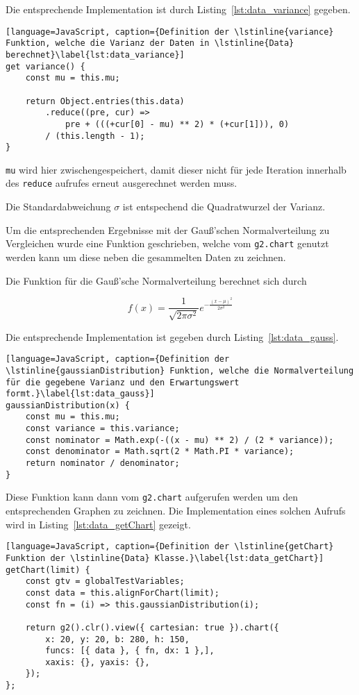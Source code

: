 Die entsprechende Implementation ist durch Listing~\ref{lst:data_variance} gegeben.

\begin{lstlisting}[language=JavaScript, caption={Definition der \lstinline{variance} Funktion, welche die Varianz der Daten in \lstinline{Data} berechnet}\label{lst:data_variance}]
get variance() {
    const mu = this.mu;

    return Object.entries(this.data)
        .reduce((pre, cur) =>
            pre + (((+cur[0] - mu) ** 2) * (+cur[1])), 0)
        / (this.length - 1);
}
\end{lstlisting}

\lstinline{mu} wird hier zwischengespeichert, damit dieser nicht für jede Iteration innerhalb des \lstinline{reduce} aufrufes erneut ausgerechnet werden muss.

Die Standardabweichung $\sigma$ ist entspechend die Quadratwurzel der Varianz.

Um die entsprechenden Ergebnisse mit der Gauß'schen Normalverteilung zu Vergleichen wurde eine Funktion geschrieben, welche vom \lstinline{g2.chart} genutzt werden kann um diese neben die gesammelten Daten zu zeichnen.

Die Funktion für die Gauß'sche Normalverteilung berechnet sich durch

\begin{equation}
    f(x) = \frac{1}{\sqrt{2\pi\sigma^2}}e^{-\frac{(x-\mu)^2}{2\sigma^2}}
\end{equation}

Die entsprechende Implementation ist gegeben durch Listing~\ref{lst:data_gauss}.

\begin{lstlisting}[language=JavaScript, caption={Definition der \lstinline{gaussianDistribution} Funktion, welche die Normalverteilung für die gegebene Varianz und den Erwartungswert formt.}\label{lst:data_gauss}]
gaussianDistribution(x) {
    const mu = this.mu;
    const variance = this.variance;
    const nominator = Math.exp(-((x - mu) ** 2) / (2 * variance));
    const denominator = Math.sqrt(2 * Math.PI * variance);
    return nominator / denominator;
}
\end{lstlisting}

Diese Funktion kann dann vom \lstinline{g2.chart} aufgerufen werden um den entsprechenden Graphen zu zeichnen.
Die Implementation eines solchen Aufrufs wird in Listing~\ref{lst:data_getChart} gezeigt.

\begin{lstlisting}[language=JavaScript, caption={Definition der \lstinline{getChart} Funktion der \lstinline{Data} Klasse.}\label{lst:data_getChart}]
getChart(limit) {
    const gtv = globalTestVariables;
    const data = this.alignForChart(limit);
    const fn = (i) => this.gaussianDistribution(i);

    return g2().clr().view({ cartesian: true }).chart({
        x: 20, y: 20, b: 280, h: 150,
        funcs: [{ data }, { fn, dx: 1 },],
        xaxis: {}, yaxis: {},
    });
};
\end{lstlisting}

